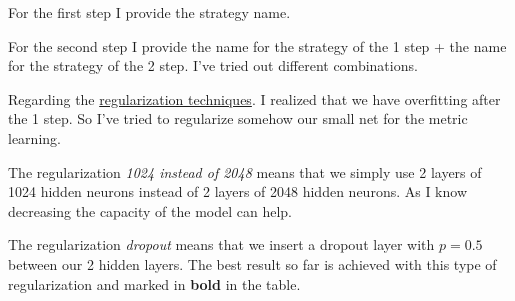 \documentclass[10pt,a4paper]{article}
\begin{document}
    For the first step I provide the strategy name.

    For the second step I provide the name for the strategy of the 1 step + the name for the strategy of the 2 step.
    I've tried out different combinations.
    \newline

    Regarding the \underline{regularization techniques}. I realized that we have overfitting after the 1 step.
    So I've tried to regularize somehow our small net for the metric learning.
    \newline

    The regularization \textit{1024 instead of 2048} means that we simply use 2 layers of 1024 hidden neurons instead
    of 2 layers of 2048 hidden neurons. As I know decreasing the capacity of the model can help.
    \newline

    The regularization \textit{dropout} means that we insert a dropout layer with $p=0.5$ between our 2 hidden layers.
    The best result so far is achieved with this type of regularization and marked in \textbf{bold} in the table.
    \newline
\end{document}
